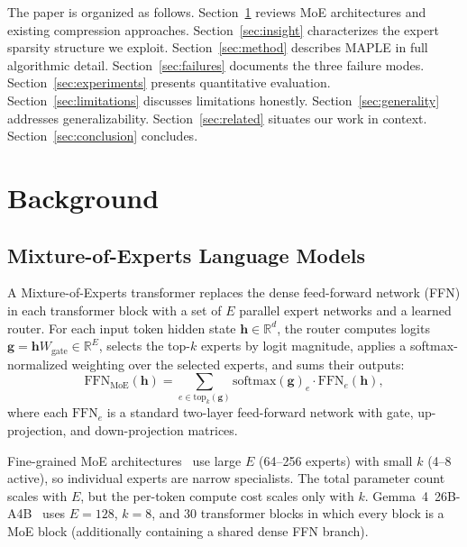 \documentclass[final]{article}
\newcommand{\MAPLE}{\textsc{MAPLE}}
\newcommand{\R}{\mathbb{R}}
\begin{document}
The paper is organized as follows. Section~\ref{sec:background} reviews MoE architectures and existing compression approaches. Section~\ref{sec:insight} characterizes the expert sparsity structure we exploit. Section~\ref{sec:method} describes \MAPLE{} in full algorithmic detail. Section~\ref{sec:failures} documents the three failure modes. Section~\ref{sec:experiments} presents quantitative evaluation. Section~\ref{sec:limitations} discusses limitations honestly. Section~\ref{sec:generality} addresses generalizability. Section~\ref{sec:related} situates our work in context. Section~\ref{sec:conclusion} concludes.

\section{Background}
\label{sec:background}

\subsection{Mixture-of-Experts Language Models}

A Mixture-of-Experts transformer replaces the dense feed-forward network (FFN) in each transformer block with a set of $E$ parallel expert networks and a learned router. For each input token hidden state $\mathbf{h} \in \R^{d}$, the router computes logits $\mathbf{g} = \mathbf{h} W_\text{gate} \in \R^E$, selects the top-$k$ experts by logit magnitude, applies a softmax-normalized weighting over the selected experts, and sums their outputs:
\begin{equation}
  \text{FFN}_\text{MoE}(\mathbf{h}) = \sum_{e \in \text{top}_k(\mathbf{g})} \text{softmax}(\mathbf{g})_e \cdot \text{FFN}_e(\mathbf{h}),
  \label{eq:moe}
\end{equation}
where each $\text{FFN}_e$ is a standard two-layer feed-forward network with gate, up-projection, and down-projection matrices.

Fine-grained MoE architectures~\cite{dai2024deepseekmoe} use large $E$ (64--256 experts) with small $k$ (4--8 active), so individual experts are narrow specialists. The total parameter count scales with $E$, but the per-token compute cost scales only with $k$. Gemma~4~26B-A4B~\cite{team2025gemma} uses $E = 128$, $k = 8$, and 30 transformer blocks in which every block is a MoE block (additionally containing a shared dense FFN branch).
\end{document}

